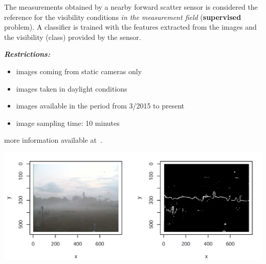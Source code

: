 \documentclass{article}
\begin{document}
The measurements obtained by a nearby forward scatter sensor is considered the
reference for the visibility conditions \emph{in the measurement field}
(\textbf{supervised} problem).\newline
A classifier is trained with the features extracted from the images and the 
visibility (class) provided by the sensor.

\textbf{\textit{Restrictions:}}
\begin{itemize}
\item images coming from static cameras only
\item images taken in daylight conditions
\item images available in the period from 3/2015 to present
\item image sampling time: 10 minutes
\end{itemize}%
more information available at~\cite{Wauben.Roth2016}.




\begin{minipage}[b]{\columnwidth}
	\begin{center}
	\includegraphics[width=0.95\columnwidth]{edges}
	\label{figEdges}
	\end{center}
\end{minipage}
\end{document}
